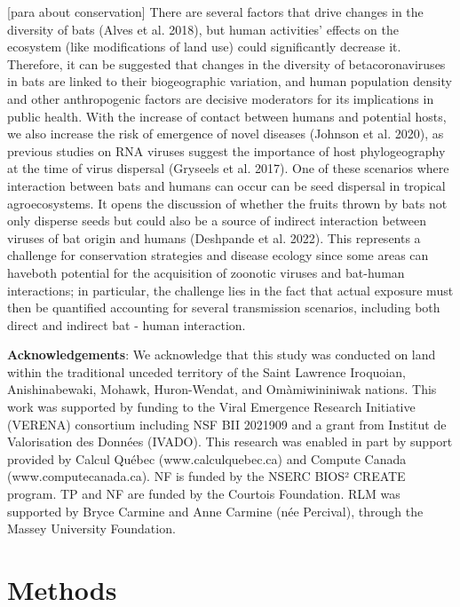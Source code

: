 \documentclass[11pt]{article}
\begin{document}
{[}para about conservation{]} There are several factors that drive
changes in the diversity of bats (Alves et al. 2018), but human
activities' effects on the ecosystem (like modifications of land use)
could significantly decrease it. Therefore, it can be suggested that
changes in the diversity of betacoronaviruses in bats are linked to
their biogeographic variation, and human population density and other
anthropogenic factors are decisive moderators for its implications in
public health. With the increase of contact between humans and potential
hosts, we also increase the risk of emergence of novel diseases (Johnson
et al. 2020), as previous studies on RNA viruses suggest the importance
of host phylogeography at the time of virus dispersal (Gryseels et al.
2017). One of these scenarios where interaction between bats and humans
can occur can be seed dispersal in tropical agroecosystems. It opens the
discussion of whether the fruits thrown by bats not only disperse seeds
but could also be a source of indirect interaction between viruses of
bat origin and humans (Deshpande et al. 2022). This represents a
challenge for conservation strategies and disease ecology since some
areas can haveboth potential for the acquisition of zoonotic viruses and
bat-human interactions; in particular, the challenge lies in the fact
that actual exposure must then be quantified accounting for several
transmission scenarios, including both direct and indirect bat - human
interaction.

\textbf{Acknowledgements}: We acknowledge that this study was conducted
on land within the traditional unceded territory of the Saint Lawrence
Iroquoian, Anishinabewaki, Mohawk, Huron-Wendat, and Omàmiwininiwak
nations. This work was supported by funding to the Viral Emergence
Research Initiative (VERENA) consortium including NSF BII 2021909 and a
grant from Institut de Valorisation des Données (IVADO). This research
was enabled in part by support provided by Calcul Québec
(www.calculquebec.ca) and Compute Canada (www.computecanada.ca). NF is
funded by the NSERC BIOS² CREATE program. TP and NF are funded by the
Courtois Foundation. RLM was supported by Bryce Carmine and Anne Carmine
(née Percival), through the Massey University Foundation.

\newpage

\hypertarget{methods}{%
\section{Methods}\label{methods}}
\end{document}

